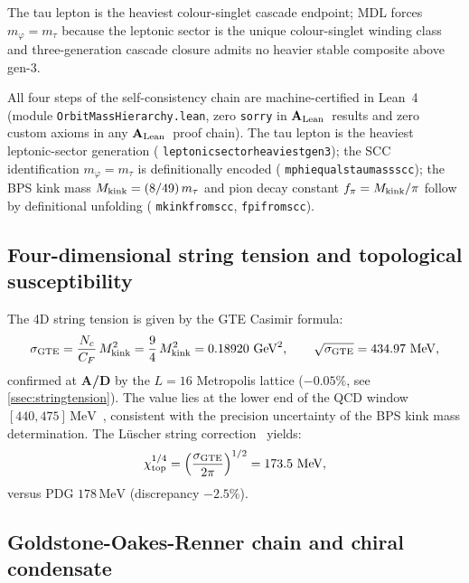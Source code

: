 \documentclass[11pt]{article}
\theoremstyle{remark}
\newcommand{\GTE}{\text{GTE}}
\newcommand{\lean}[1]{%
  \penalty-100
  \begingroup\def\_{\textunderscore\allowbreak}\texttt{#1}\endgroup}
\newcommand{\CatAL}{\ensuremath{\textbf{A}_{\rm Lean}}}
\newcommand{\CatAD}{\textbf{A/D}}
\begin{document}
The tau lepton is the heaviest colour-singlet cascade endpoint; MDL forces $m_\varphi = m_\tau$ because the leptonic sector is the unique colour-singlet winding class and three-generation cascade closure admits no heavier stable composite above gen-3.

All four steps of the self-consistency chain are machine-certified in Lean~4
(module \lean{OrbitMassHierarchy.lean}, zero \texttt{sorry} in \CatAL\ results and zero custom axioms in any \CatAL\ proof chain).
The tau lepton is the heaviest leptonic-sector generation
(\lean{leptonic\_sector\_heaviest\_gen3}); the SCC identification
$m_\varphi = m_\tau$ is definitionally encoded
(\lean{mphi\_equals\_tau\_mass\_scc}); the BPS kink mass
$M_{\rm kink} = (8/49)\,m_\tau$ and pion decay constant
$f_\pi = M_{\rm kink}/\pi$ follow by definitional unfolding
(\lean{mkink\_from\_scc}, \lean{fpi\_from\_scc}).

\subsection{Four-dimensional string tension and topological susceptibility}
\label{ssec:sigma4}

The 4D string tension is given by the GTE Casimir formula:
\begin{equation}
  \sigma_{\GTE} = \frac{N_c}{C_F}\,M_{\rm kink}^2 = \frac{9}{4}\,M_{\rm kink}^2
    = 0.18920\ \mathrm{GeV}^2,
  \qquad
  \sqrt{\sigma_{\GTE}} = 434.97\ \mathrm{MeV},
  \label{eq:sigma4d}
\end{equation}
confirmed at \CatAD{} by the $L=16$ Metropolis lattice ($-0.05\%$, see \cref{ssec:stringtension}).
The value lies at the lower end of the QCD window $[440, 475]\,\mathrm{MeV}$~\cite{PDG2022},
consistent with the precision uncertainty of the BPS kink mass determination.
The L\"{u}scher string correction~\cite{Luscher1981} yields:
\begin{equation}
  \chi_{\rm top}^{1/4} = \left(\frac{\sigma_{\GTE}}{2\pi}\right)^{1/2}
    = 173.5\ \mathrm{MeV},
  \label{eq:chitop}
\end{equation}
versus PDG $178\,\mathrm{MeV}$ (discrepancy $-2.5\%$).

\subsection{Goldstone-Oakes-Renner chain and chiral condensate}
\label{ssec:gor}
\end{document}
